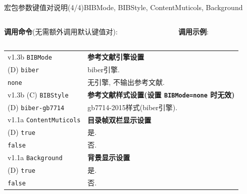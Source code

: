 \begin{frame}{ 宏包参数键值对说明(4/4)}{BIBMode, BIBStyle, ContentMuticols, Background}
	\begin{columns}[T, onlytextwidth]%
		\begin{column}{.5\textwidth}
			\textbf{调用命令}(无需额外调用默认键值对):\\
		\end{column}
		\begin{column}{.5\textwidth}
			\textbf{调用示例}:\\
		\end{column}
	\end{columns}

	\begin{table}[h]
		\centering
		\begin{tabular}{>{\raggedleft\arraybackslash}p{}p{}}
			v1.3b \alert{\texttt{BIBMode}} & \textbf{参考文献引擎设置}\\
			(D) \texttt{biber} & biber引擎.\\
			\texttt{none} & 无引擎, 不输出参考文献.\\
			\midrule
			v1.3b (C) \alert{\texttt{BIBStyle}} & \textbf{参考文献样式设置(设置 \texttt{\alert{BIBMode}=none} 时无效)}\\
			(D) \texttt{biber-gb7714} & gb7714-2015样式(biber引擎).\\
			\midrule
			v1.1a \alert{\texttt{ContentMuticols}} & \textbf{目录帧双栏显示设置}\\
			(D) \texttt{true} & 是.\\
			\texttt{false} & 否.\\
			\midrule
			v1.1a \alert{\texttt{Background}} & \textbf{背景显示设置}\\
			(D) \texttt{true} & 是.\\
			\texttt{false} & 否.\\
		\end{tabular}
	\end{table}
\end{frame}

